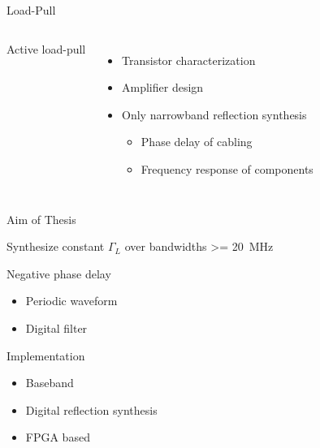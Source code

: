 \documentclass{beamer}
\begin{document}
\begin{frame}{Load-Pull}
\begin{columns}
\begin{exampleblock}{Active load-pull}
{
                }
            \end{exampleblock}
            \begin{itemize}
                \item Transistor characterization
                \item Amplifier design
                \item Only narrowband reflection synthesis
                \begin{itemize}
                    \item Phase delay of cabling
                    \item Frequency response of components
                \end{itemize}
            \end{itemize}
    \end{columns}
\end{frame}

\begin{frame}{Aim of Thesis}
    \begin{exampleblock}{Synthesize constant $\Gamma_L$ over bandwidths \SI{>= 20}{\mega\hertz}}
        \centering
        \begin{minipage}{.9\textwidth}
            \begin{block}{Negative phase delay}
                \begin{itemize}
                    \item Periodic waveform
                    \item Digital filter
                \end{itemize}
            \end{block}
            \begin{block}{Implementation}
                \begin{itemize}
                    \item Baseband
                    \item Digital reflection synthesis
                    \item FPGA based
                \end{itemize}
            \end{block}
        \end{minipage}
    \end{exampleblock}
\end{frame}
\end{document}
